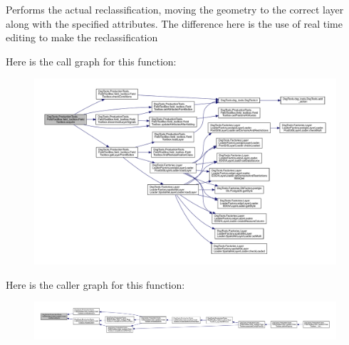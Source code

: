 \begin{DoxyVerb}Performs the actual reclassification, moving the geometry to the correct layer along with the specified attributes.
The difference here is the use of real time editing to make the reclassification
\end{DoxyVerb}
 Here is the call graph for this function\+:
\nopagebreak
\begin{figure}[H]
\begin{center}
\leavevmode
\includegraphics[width=350pt]{class_dsg_tools_1_1_production_tools_1_1_field_tool_box_1_1field__toolbox_1_1_field_toolbox_a01778366fc84013a9a8586c4ee65850b_cgraph}
\end{center}
\end{figure}
Here is the caller graph for this function\+:
\nopagebreak
\begin{figure}[H]
\begin{center}
\leavevmode
\includegraphics[width=350pt]{class_dsg_tools_1_1_production_tools_1_1_field_tool_box_1_1field__toolbox_1_1_field_toolbox_a01778366fc84013a9a8586c4ee65850b_icgraph}
\end{center}
\end{figure}
\mbox{\label{class_dsg_tools_1_1_production_tools_1_1_field_tool_box_1_1field__toolbox_1_1_field_toolbox_a19f0de63a76b240ecb670e16be5cc39e}} 
